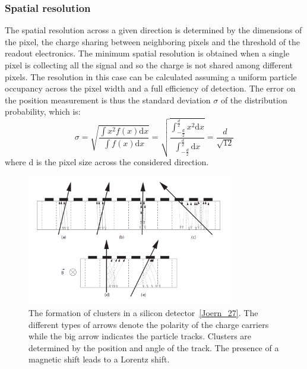 \subsubsection{Spatial resolution} 
The spatial resolution across a given direction is determined by the dimensions of the pixel, the charge sharing between neighboring pixels and the threshold of the readout electronics.
The minimum spatial resolution is obtained when a single pixel is collecting all the signal and so the charge is not shared among different pixels.
The resolution in this case can be calculated assuming a uniform particle occupancy across the pixel width and a full efficiency of detection. %
The error on the position measurement is thus the standard deviation $\sigma$ of the distribution probability, which is:
\begin{equation}
\sigma = \sqrt{\frac{\int x^2 f(x) \mathrm{d}x}{\int f(x) \mathrm{d}x}} = \sqrt{\frac{\int_{-\frac{d}{2}}^{\frac{d}{2}} x^2 \mathrm{d}x}{\int_{-\frac{d}{2}}^{\frac{d}{2}}  \mathrm{d}x}} = \frac{d}{\sqrt{12}}
\end{equation}
where d is the pixel size across the considered direction.
\begin{figure}
\centering
\includegraphics[width=0.8\textwidth]{Images/tracking_det/Lorentz.png}
\caption{The formation of clusters in a silicon detector~\ref{Joern_27}. The different types of arrows denote the polarity of the charge carriers while the big arrow indicates the particle tracks. Clusters are determined by the position and angle of the track. The presence of a magnetic shift leads to a Lorentz shift.}
\label{pic:Lorentz}
\end{figure}

